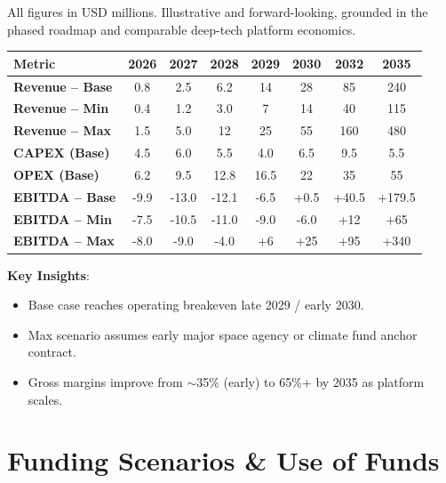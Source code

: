 \documentclass[11pt,a4paper]{article}
\begin{document}
All figures in USD millions. Illustrative and forward-looking, grounded in the phased roadmap and comparable deep-tech platform economics.

\begin{center}
\begin{tabular}{lccccccc}
\toprule
\textbf{Metric} & \textbf{2026} & \textbf{2027} & \textbf{2028} & \textbf{2029} & \textbf{2030} & \textbf{2032} & \textbf{2035} \\
\midrule
\textbf{Revenue -- Base} & 0.8 & 2.5 & 6.2 & 14 & 28 & 85 & 240 \\
\textbf{Revenue -- Min}  & 0.4 & 1.2 & 3.0 & 7  & 14 & 40 & 115 \\
\textbf{Revenue -- Max}  & 1.5 & 5.0 & 12  & 25 & 55 & 160 & 480 \\
\midrule
\textbf{CAPEX (Base)}    & 4.5 & 6.0 & 5.5 & 4.0 & 6.5 & 9.5 & 5.5 \\
\textbf{OPEX (Base)}     & 6.2 & 9.5 & 12.8 & 16.5 & 22 & 35 & 55 \\
\midrule
\textbf{EBITDA -- Base}  & -9.9 & -13.0 & -12.1 & -6.5 & +0.5 & +40.5 & +179.5 \\
\textbf{EBITDA -- Min}   & -7.5 & -10.5 & -11.0 & -9.0 & -6.0 & +12 & +65 \\
\textbf{EBITDA -- Max}   & -8.0 & -9.0 & -4.0 & +6 & +25 & +95 & +340 \\
\bottomrule
\end{tabular}
\end{center}

\textbf{Key Insights}:
\begin{itemize}
    \item Base case reaches operating breakeven late 2029 / early 2030.
    \item Max scenario assumes early major space agency or climate fund anchor contract.
    \item Gross margins improve from $\sim$35\% (early) to 65\%+ by 2035 as platform scales.
\end{itemize}

\section{Funding Scenarios \& Use of Funds}
\end{document}
